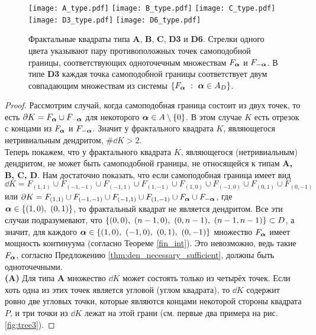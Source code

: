 \begin{figure}[H]
\centering
\texttt{[image: A\_type.pdf]}
\hfill
\texttt{[image: B\_type.pdf]}
\hfill
\texttt{[image: C\_type.pdf]}\\
\hfill
\texttt{[image: D3\_type.pdf]}
\hfill
\texttt{[image: D6\_type.pdf]}
\hfill
\caption{Фрактальные квадраты типа {\bf A}, {\bf B}, {\bf C}, {\bf D3} и {\bf D6}. Стрелки одного цвета указывают пару противоположных точек самоподобной границы, соответствующих одноточечным множествам $F_{\bm{\alpha}}$ и $F_{-{\bm{\alpha}}}$. В типе {\bf D3} каждая точка самоподобной границы соответствует двум совпадающим множествам из системы $\{F_{\bm{\alpha}}\ :\ {\bm{\alpha}}\in A_D\}$.}
\end{figure}

\begin{proof}
Рассмотрим случай, когда самоподобная граница состоит из двух точек, то есть $\partial K=F_{\bm{\alpha}}\cup F_{-{\bm{\alpha}}}$ для некоторого ${\bm{\alpha}}\in A\setminus\{0\}$.
В этом случае $K$  есть отрезок с концами из $F_{\bm{\alpha}}$ и $ F_{-{\bm{\alpha}}}$.
Значит у фрактального квадрата $K$, являющегося нетривиальным дендритом, $\#\dd K>2$.\\

Теперь покажем, что у фрактального квадрата $K$, являющегося (нетривиальным) дендритом, не может быть самоподобной границы, не относящейся к типам {\bf A, B, C, D}.
Нам достаточно показать, что если самоподобная граница имеет вид $\dd K=F_{(1,1)}\cup F_{(-1,-1)}\cup F_{(-1,1)}\cup F_{(1,-1)}\cup F_{(1,0)}\cup F_{(-1,0)}\cup F_{(0,1)}\cup F_{(0,-1)}$ или $\partial K=F_{(1,1)}\cup F_{(-1,-1)}\cup F_{(-1,1)}\cup F_{(1,-1)}\cup F_{\bm{\alpha}}\cup F_{-{\bm{\alpha}}}$, где ${\bm{\alpha}}\in\{(1,0),\ (0,1)\}$, то фрактальный квадрат не является дендритом.
Все эти случаи подразумевают, что $\{(0,0),\ (n-1,0),\ (0,n-1),\ (n-1,n-1)\}\subset D$, а значит, для каждого ${\bm{\alpha}}\in\{(1,0),\ (-1,0),\ (0,1),\ (0,-1)\}$ множество $F_{\bm{\alpha}}$ имеет мощность континуума (согласно Теореме \ref{fin_int}).
Это невозможно, ведь такие $F_{\bm{\alpha}}$, согласно Предложению \ref{thm:den_necessary_sufficient}, должны быть одноточечными.\\

{\bf (A)} Для типа {\bf A} множество $\dd K$ может состоять только из четырёх точек. 
Если хоть одна из этих точек является угловой (углом квадрата), то $\dd K$ содержит ровно две угловых точки, которые являются концами некоторой стороны квадрата $P$, и три точки из $\dd K$ лежат на этой грани (см. первые два примера на рис. \ref{fig:tree3}).


\end{proof}
